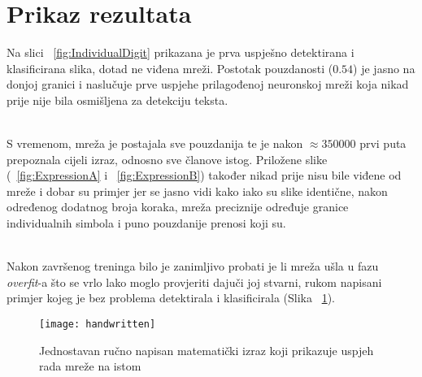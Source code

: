 \section{Prikaz rezultata}
Na slici ~\ref{fig:IndividualDigit} prikazana je prva uspješno detektirana i klasificirana slika, dotad ne viđena mreži.
Postotak pouzdanosti ($0.54$) je jasno na donjoj granici i naslučuje prve uspjehe prilagođenoj neuronskoj mreži koja nikad prije nije bila osmišljena za detekciju teksta.
\begin{figure}
\end{figure} \\
S vremenom, mreža je postajala sve pouzdanija te je nakon $\approx 350000$ prvi puta prepoznala cijeli izraz, odnosno sve članove istog.
Priložene slike (~\ref{fig:ExpressionA} i ~\ref{fig:ExpressionB}) također nikad prije nisu bile viđene od mreže i dobar su primjer jer se jasno vidi kako iako su slike identične, nakon određenog dodatnog broja koraka, mreža preciznije određuje granice individualnih simbola i puno pouzdanije prenosi koji su. \\
\begin{figure}
\end{figure} \\
Nakon završenog treninga bilo je zanimljivo probati je li mreža ušla u fazu \emph{overfit}-a što se vrlo lako moglo provjeriti dajuči joj stvarni, rukom napisani primjer kojeg je bez problema detektirala i klasificirala (Slika ~\ref{fig:Handwritten}).
\begin{figure}[h!]
	\texttt{[image: handwritten]}
	\caption{Jednostavan ručno napisan matematički izraz koji prikazuje uspjeh rada mreže na istom}
	\label{fig:Handwritten}
\end{figure}
